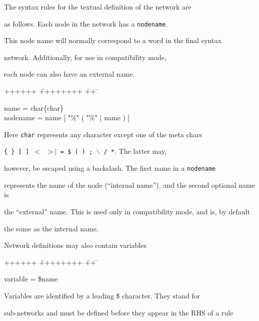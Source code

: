 The syntax rules for the textual definition of the network are 


as follows.  Each node in the network has a \texttt{nodename}.


This node name will normally correspond to a word in the final syntax


network. Additionally, for use in compatibility mode,


each node can also have an external name.


{\sf


\begin{tabbing}


++++++ \= ++++++++ \= ++ \= \kill


\>        name \> = \> char\{char\} \\


\>        nodename \> = \> name [ "\%" ( "\%" $|$ name ) ]


\end{tabbing}}





\noindent


Here \texttt{char} represents any character except one of the meta chars 


\texttt{\{ \} [ ] $<$ $>$$|$ = \$ ( ) ; $\backslash$ / *}.   The latter may, 


however, be escaped using a backslash.  The first name in a \texttt{nodename}


represents the name of the node (``internal name''), and the second optional name is


the ``external'' name.  This is used only in compatibility mode, and is, by default


the same as the internal name.





Network definitions may also contain variables


{\sf


\begin{tabbing}


++++++ \= ++++++++ \= ++ \= \kill


\>      variable \> = \> \$name


\end{tabbing}}


\noindent


Variables are identified by a leading \$ character.  They stand for


sub-networks and must be defined before they appear in the RHS of a rule


